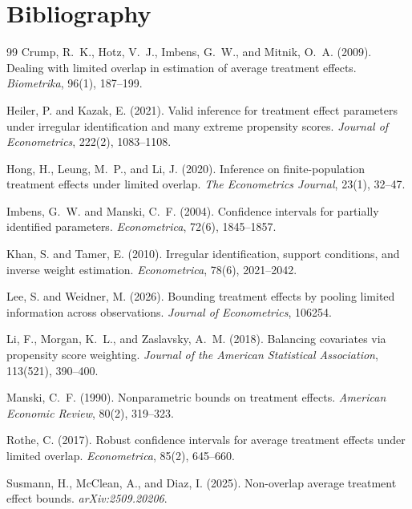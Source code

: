 \documentclass[11pt]{article}
\theoremstyle{definition}
\theoremstyle{plain}
\theoremstyle{remark}
\begin{document}
\section*{Bibliography}
\begin{thebibliography}{99}
Crump, R.~K., Hotz, V.~J., Imbens, G.~W., and Mitnik, O.~A. (2009).
Dealing with limited overlap in estimation of average treatment effects.
\emph{Biometrika}, 96(1), 187--199.

Heiler, P. and Kazak, E. (2021).
Valid inference for treatment effect parameters under irregular identification and many
extreme propensity scores.
\emph{Journal of Econometrics}, 222(2), 1083--1108.

Hong, H., Leung, M.~P., and Li, J. (2020).
Inference on finite-population treatment effects under limited overlap.
\emph{The Econometrics Journal}, 23(1), 32--47.

Imbens, G.~W. and Manski, C.~F. (2004).
Confidence intervals for partially identified parameters.
\emph{Econometrica}, 72(6), 1845--1857.

Khan, S. and Tamer, E. (2010).
Irregular identification, support conditions, and inverse weight estimation.
\emph{Econometrica}, 78(6), 2021--2042.

Lee, S. and Weidner, M. (2026).
Bounding treatment effects by pooling limited information across observations.
\emph{Journal of Econometrics}, 106254.

Li, F., Morgan, K.~L., and Zaslavsky, A.~M. (2018).
Balancing covariates via propensity score weighting.
\emph{Journal of the American Statistical Association}, 113(521), 390--400.

Manski, C.~F. (1990).
Nonparametric bounds on treatment effects.
\emph{American Economic Review}, 80(2), 319--323.

Rothe, C. (2017).
Robust confidence intervals for average treatment effects under limited overlap.
\emph{Econometrica}, 85(2), 645--660.

Susmann, H., McClean, A., and Diaz, I. (2025).
Non-overlap average treatment effect bounds.
\emph{arXiv:2509.20206}.
\end{thebibliography}
\end{document}
